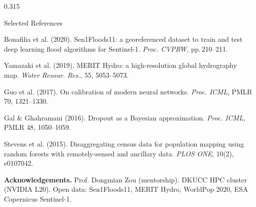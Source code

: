 \documentclass[final]{beamer}
\begin{document}
\begin{frame}[t,fragile]{}
\begin{columns}[T]
\begin{column}{0.315\textwidth}
\begin{minipage}{0.93\textwidth}
\begin{tcolorbox}[sectiontitle]
  \vphantom{Ag} Selected References
\end{tcolorbox}
\vspace{4pt}
\begin{tcolorbox}[
  enhanced, boxrule=0pt, frame hidden,
  colback=dkuLightGrey, arc=4pt,
  left=10pt, right=10pt, top=6pt, bottom=6pt,
  fontupper=\scriptsize,
]
\begin{enumerate}[leftmargin=1.4em,itemsep=2pt,label={[\arabic*]}]
  \item Bonafilia et al. (2020). Sen1Floods11: a georeferenced dataset to train
    and test deep learning flood algorithms for Sentinel-1.
    \textit{Proc. CVPRW}, pp.\,210--211.
  \item Yamazaki et al. (2019). MERIT Hydro: a high-resolution global hydrography
    map. \textit{Water Resour. Res.}, 55, 5053--5073.
  \item Guo et al. (2017). On calibration of modern neural networks.
    \textit{Proc. ICML}, PMLR 70, 1321--1330.
  \item Gal \& Ghahramani (2016). Dropout as a Bayesian approximation.
    \textit{Proc. ICML}, PMLR 48, 1050--1059.
  \item Stevens et al. (2015). Disaggregating census data for population
    mapping using random forests with remotely-sensed and ancillary data.
    \textit{PLOS ONE}, 10(2), e0107042.
\end{enumerate}
\end{tcolorbox}

\vspace{8pt}

\begin{tcolorbox}[
  enhanced, boxrule=0pt, frame hidden,
  colback=dkuLightTeal, arc=4pt,
  left=10pt, right=10pt, top=6pt, bottom=6pt,
  fontupper=\footnotesize,
]
\textbf{Acknowledgements.} Prof. Dongmian Zou (mentorship). DKUCC HPC cluster
(NVIDIA L20). Open data: Sen1Floods11, MERIT Hydro, WorldPop 2020, ESA
Copernicus Sentinel-1.
\end{tcolorbox}

\end{minipage}
\end{column}

\end{columns}

\vspace{1.0cm}


\end{frame}
\end{document}
